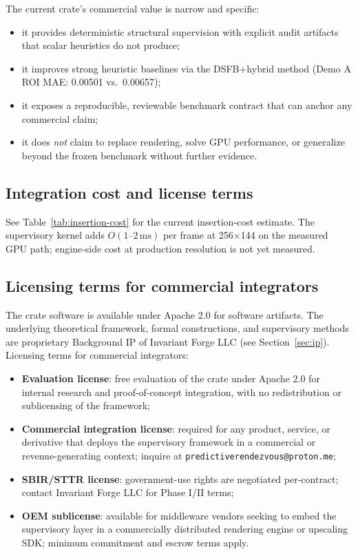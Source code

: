 \documentclass[11pt,letterpaper]{article}
\theoremstyle{gcresult}
\theoremstyle{definition}
\begin{document}
The current crate's commercial value is narrow and specific:
\begin{itemize}[leftmargin=1.5em]
    \item it provides deterministic structural supervision with explicit audit artifacts that scalar heuristics do not produce;
    \item it improves strong heuristic baselines via the DSFB+hybrid method (Demo A ROI MAE: 0.00501 vs.\ 0.00657);
    \item it exposes a reproducible, reviewable benchmark contract that can anchor any commercial claim;
    \item it does \emph{not} claim to replace rendering, solve GPU performance, or generalize beyond the frozen benchmark without further evidence.
\end{itemize}

\subsection{Integration cost and license terms}

See Table~\ref{tab:insertion-cost} for the current insertion-cost estimate. The supervisory kernel adds $O(1\text{--}2\,\mathrm{ms})$ per frame at 256$\times$144 on the measured GPU path; engine-side cost at production resolution is not yet measured.

\subsection{Licensing terms for commercial integrators}
\label{sec:commercial-licensing}

The crate software is available under Apache 2.0 for software artifacts. The underlying theoretical framework, formal constructions, and supervisory methods are proprietary Background IP of Invariant Forge LLC (see Section~\ref{sec:ip}). Licensing terms for commercial integrators:
\begin{itemize}[leftmargin=1.5em]
    \item \textbf{Evaluation license}: free evaluation of the crate under Apache 2.0 for internal research and proof-of-concept integration, with no redistribution or sublicensing of the framework;
    \item \textbf{Commercial integration license}: required for any product, service, or derivative that deploys the supervisory framework in a commercial or revenue-generating context; inquire at \texttt{predictiverendezvous@proton.me};
    \item \textbf{SBIR/STTR license}: government-use rights are negotiated per-contract; contact Invariant Forge LLC for Phase I/II terms;
    \item \textbf{OEM sublicense}: available for middleware vendors seeking to embed the supervisory layer in a commercially distributed rendering engine or upscaling SDK; minimum commitment and escrow terms apply.
\end{itemize}
\end{document}

